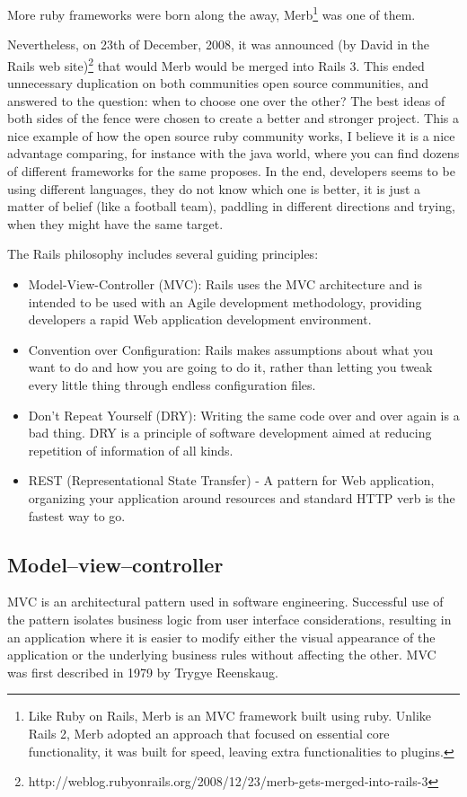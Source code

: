 More ruby frameworks were born along the away, 
\textsf{Merb}\footnote{
 Like Ruby on Rails, Merb is an MVC framework built using ruby.
 Unlike Rails 2, Merb adopted an approach that focused on essential core functionality, 
 it was built for speed, leaving extra functionalities to plugins.
}
was one of them.

Nevertheless, on 23th of December, 2008, it was announced
\textsf{(by David in the Rails web site)}\footnote{
 http://weblog.rubyonrails.org/2008/12/23/merb-gets-merged-into-rails-3
}
that
would Merb would be merged into Rails 3.
This ended unnecessary duplication on both communities open source communities, 
and answered to the question: when to choose one over the other?
The best ideas of both sides of the fence were chosen to create a better and stronger project.
This a nice example of how the open source ruby community works, 
I believe it is a nice advantage comparing, for instance with the java world, 
where you can find dozens of different frameworks for the same proposes.
In the end, developers seems to be using different languages,
they do not know which one is better, it is just a matter of belief (like a football team),
paddling in different directions and trying, when they might have the same target.

The Rails philosophy includes several guiding principles:
\begin{itemize}
\item Model-View-Controller (MVC): Rails uses the MVC architecture and 
      is intended to be used with an Agile development methodology,
      providing developers a rapid Web application development environment.
\item Convention over Configuration: Rails makes assumptions about 
      what you want to do and how you are going to do it, 
      rather than letting you tweak every little thing through endless configuration files.
\item Don’t Repeat Yourself (DRY): Writing the same code over and over again is a bad thing. 
      DRY is a principle of software development aimed at reducing repetition of information of all kinds.
\item REST (Representational State Transfer) - A pattern for Web application, 
      organizing your application around resources and standard HTTP verb is the fastest way to go.
\end{itemize}

\subsection{Model–view–controller} 
MVC is an architectural pattern used in software engineering. 
Successful use of the pattern isolates business logic from user interface considerations, 
resulting in an application where it is easier to modify either the visual appearance of the application 
or the underlying business rules without affecting the other.
MVC was first described in 1979 by Trygye Reenskaug.


